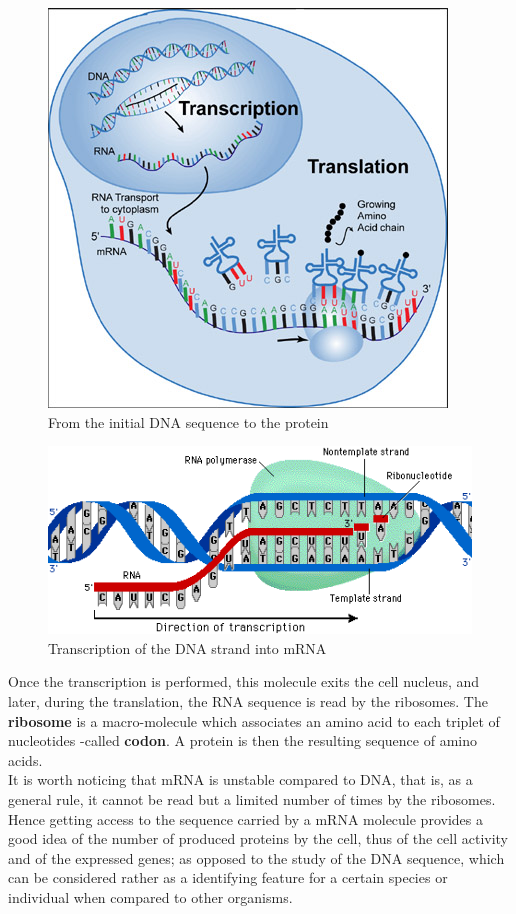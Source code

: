 \documentclass{report}
\begin{document}
\begin{figure}[H]
\centering
\includegraphics[scale=0.5]{illustrations/all.png}
\caption{From the initial DNA sequence to the protein}
\label{transcTransl}
\end{figure}

\begin{figure}[H]
\centering
\includegraphics[scale=0.5]{illustrations/transcription.png}
\caption{Transcription of the DNA strand into mRNA}
\label{transcription}
\end{figure}

Once the transcription is performed, this molecule exits the cell nucleus, and later, during the translation, the RNA sequence is read by the ribosomes. The \textbf{ribosome} is a macro-molecule which associates an amino acid to each triplet of nucleotides -called \textbf{codon}. A protein is then the resulting sequence of amino acids.\\ 

It is worth noticing that mRNA is unstable\cite{brenner1961unstable} compared to DNA, that is, as a general rule, it cannot be read but a limited number of times by the ribosomes. Hence getting access to the sequence carried by a mRNA molecule provides a good idea of the number of produced proteins by the cell, thus of the cell activity and of the expressed genes; as opposed to the study of the DNA sequence, which can be considered rather as a identifying feature for a certain species or individual when compared to other organisms.\\ 
\end{document}
